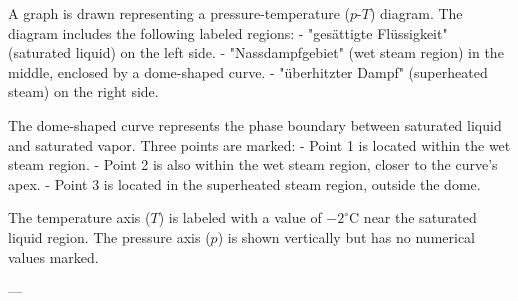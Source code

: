A graph is drawn representing a pressure-temperature (\(p\)-\(T\)) diagram. The diagram includes the following labeled regions:  
- "gesättigte Flüssigkeit" (saturated liquid) on the left side.  
- "Nassdampfgebiet" (wet steam region) in the middle, enclosed by a dome-shaped curve.  
- "überhitzter Dampf" (superheated steam) on the right side.  

The dome-shaped curve represents the phase boundary between saturated liquid and saturated vapor. Three points are marked:  
- Point 1 is located within the wet steam region.  
- Point 2 is also within the wet steam region, closer to the curve's apex.  
- Point 3 is located in the superheated steam region, outside the dome.  

The temperature axis (\(T\)) is labeled with a value of \(-2^\circ\text{C}\) near the saturated liquid region. The pressure axis (\(p\)) is shown vertically but has no numerical values marked.

---